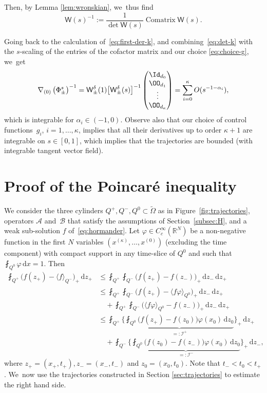 \documentclass[JEP,XML,SOM,Unicode,NoFloatCountersInSection,published]{cedram}
\theoremstyle{definition}
\newcommand\R{{\mathbb R}}
\newcommand{\cI}{{\mathcal I}}
\newcommand{\sW}{{\mathsf W}}
\newcommand{\dd}{{\, \mathrm d}}
\begin{document}
Then, by Lemma \ref{lem:wronskian}, we~thus find
\begin{equation*}
\sW (s)^{-1} :=
\frac{1}{\det \sW(s)} \operatorname{Comatrix} \sW(s).
\end{equation*}

Going back to the calculation of~\eqref{eq:first-der-k}, and combining~\eqref{eq:det-k}
with the $s$-scaling of the entries of the cofactor matrix and our choice \eqref{eq:choice-g}, we~get
\begin{equation}
\label{eq:grad-phi}
\nabla_{(0)} \left(\Phi^s_\pm \right)^{-1}
= \sW_\pm ^\delta (1) \big[\sW_\pm ^\delta(s)\big]^{-1}
\begin{pmatrix}
\Id_{d_0} \\ \OO_{d_1} \\ \vdots \\ \OO_{d_\kappa}
\end{pmatrix}
= \sum_{i=0} ^\kappa O(s^{-1-\alpha_i}),
\end{equation}
which is integrable for $\alpha_i \in (-1,0)$. Observe also that
our choice of control functions~$g_i$, $i=1,\dots,\kappa$,
implies that all their derivatives up to order $\kappa+1$ are
integrable on $s \in [0,1]$, which implies that the trajectories
are bounded (with integrable tangent vector field).

\section{Proof of the Poincaré inequality}
\label{sec:proof}

We consider the three cylinders $Q^+,Q^-, Q^0 \subset \tilde \Omega$ as
in Figure~\ref{fig:trajectories}, operators $\mathcal A$ and~$\mathcal B$ that satisfy the assumptions of Section~\ref{subsec:H}, and a weak sub-solution $f$
of~\eqref{eq:hormander}. Let $\varphi \in C_c^\infty(\R^{N})$ be a
non-negative function in the first $N$ variables
$(x^{(\kappa)},\dots,x^{(0)})$ (excluding the time component)
with compact support in any time-slice of $Q^0$ and such that
$\fint_{Q^0} \varphi \dd x = 1$. Then
\begin{equation}
\label{eq:poincare-aux}
\begin{aligned}
\fint_{Q^+} \Big(f(z_+) - \langle f\rangle_{Q^-}\Big)_+ \dd
z_+ & \leq \fint_{Q^+} \fint_{Q^-} \Big(f(z_+) - f(z_{-})
\Big)_+
\dd z_{-} \dd z_+ \\
& \leq \fint_{Q^+} \fint_{Q^-} \Big(f(z_+) - \langle
f\varphi\rangle_{Q^0}\Big)_+\dd z_{-} \dd z_+ \\
&\quad + \fint_{Q^+} \fint_{Q^-} \Big(\langle
f\varphi\rangle_{Q^0} - f(z_{-})\Big)_+ \dd z_{-}\dd z_+ \\
& \leq \fint_{Q^+} \Bigg\{\underbrace{\fint_{Q^0} \big(f(z_+)
- f(z_0)\big)\varphi(x_0) \dd z_0}_{=: \cI^+}
\Bigg\}_+ \dd z_+ \\
& \quad + \fint_{Q^-} \Bigg\{\underbrace{\fint_{Q^0}
\big(f(z_0) - f(z_{-})\big)\varphi(x_0) \dd z_0}_{=:
\cI^-}\Bigg\}_+ \dd z_{-},
\end{aligned}
\end{equation}
where $z_+ = (x_+, t_+), z_- = (x_-, t_-)$ and
$z_0 = (x_0, t_0)$. Note that $t_{-} < t_0 < t_+$. We~now use
the trajectories constructed in Section \ref{sec:trajectories} to
estimate the right hand side.
\end{document}
